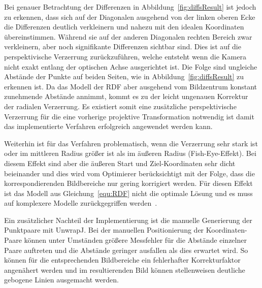 Bei genauer Betrachtung der Differenzen in Abbildung~\ref{fig:diffsResult} ist jedoch zu erkennen, dass sich auf der Diagonalen ausgehend von der linken oberen Ecke die Differenzen deutlich verkleinern und nahezu mit den idealen Koordinaten übereinstimmen. Während sie auf der anderen Diagonalen rechten Bereich zwar verkleinern, aber noch signifikante Differenzen sichtbar sind. Dies ist auf die perspektivische Verzerrung zurückzuführen, welche entsteht wenn die Kamera nicht exakt entlang der optischen Achse ausgerichtet ist. Die Folge sind ungleiche Abstände der Punkte auf beiden Seiten, wie in Abbildung~\ref{fig:diffsResult} zu erkennen ist. Da das Modell der RDF aber ausgehend vom Bildzentrum konstant zunehmende Abstände annimmt, kommt es zu der leicht ungenauen Korrektur der radialen Verzerrung.
Es existiert somit eine zusätzliche perspektivische Verzerrung für die eine vorherige projektive Transformation notwendig ist damit das implementierte Verfahren erfolgreich angewendet werden kann.

Weiterhin ist für das Verfahren problematisch, wenn die Verzerrung sehr stark ist oder im mittleren Radius größer ist als im äußeren Radius (Fish-Eye-Effekt)\cite{WangRaddist}. Bei diesem Effekt sind aber die äußeren Start und Ziel-Koordinaten sehr dicht beieinander und dies wird vom  Optimierer berücksichtigt mit der Folge, dass die korrespondierenden Bildbereiche nur gering korrigiert werden. Für diesen Effekt ist das Modell aus Gleichung~\ref{equ:RDF} nicht die optimale Lösung und es muss auf komplexere Modelle zurückgegriffen werden~\cite{WangRaddist}. 

Ein zusätzlicher Nachteil der Implementierung ist die manuelle Generierung der Punktpaare mit UnwrapJ. Bei der manuellen Positionierung der Koordinaten-Paare können unter Umständen größere Messfehler für die Abstände einzelner Paare auftreten und die Abstände geringer ausfallen als dies erwartet wird. So können für die entsprechenden Bildbereiche ein fehlerhafter Korrekturfaktor angenähert werden und im resultierenden Bild können stellenweisen deutliche gebogene Linien ausgemacht werden. 

